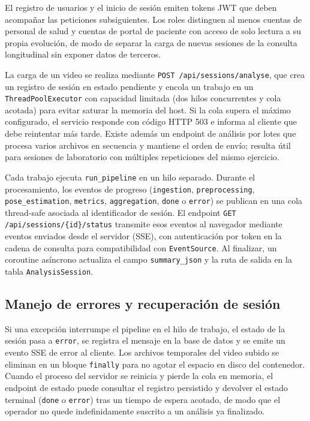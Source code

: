 El registro de usuarios y el inicio de sesión emiten tokens JWT que deben acompañar las peticiones subsiguientes. Los roles distinguen al menos cuentas de personal de salud y cuentas de portal de paciente con acceso de solo lectura a su propia evolución, de modo de separar la carga de nuevas sesiones de la consulta longitudinal sin exponer datos de terceros.

La carga de un video se realiza mediante \texttt{POST /api/sessions/analyse}, que crea un registro de sesión en estado pendiente y encola un trabajo en un \texttt{ThreadPoolExecutor} con capacidad limitada (dos hilos concurrentes y cola acotada) para evitar saturar la memoria del host. Si la cola supera el máximo configurado, el servicio responde con código HTTP 503 e informa al cliente que debe reintentar más tarde. Existe además un endpoint de análisis por lotes que procesa varios archivos en secuencia y mantiene el orden de envío; resulta útil para sesiones de laboratorio con múltiples repeticiones del mismo ejercicio.

\begin{sloppypar}
Cada trabajo ejecuta \texttt{run\_pipeline} en un hilo separado. Durante el procesamiento, los eventos de progreso (\texttt{ingestion}, \texttt{preprocessing}, \texttt{pose\_estimation}, \texttt{metrics}, \texttt{aggregation}, \texttt{done} o \texttt{error}) se publican en una cola thread-safe asociada al identificador de sesión. El endpoint \texttt{GET /api/sessions/\{id\}/status} transmite esos eventos al navegador mediante eventos enviados desde el servidor (SSE), con autenticación por token en la cadena de consulta para compatibilidad con \texttt{EventSource}. Al finalizar, un coroutine asíncrono actualiza el campo \texttt{summary\_json} y la ruta de salida en la tabla \texttt{AnalysisSession}.
\end{sloppypar}

\subsection{Manejo de errores y recuperación de sesión}

Si una excepción interrumpe el pipeline en el hilo de trabajo, el estado de la sesión pasa a \texttt{error}, se registra el mensaje en la base de datos y se emite un evento SSE de error al cliente. Los archivos temporales del video subido se eliminan en un bloque \texttt{finally} para no agotar el espacio en disco del contenedor. Cuando el proceso del servidor se reinicia y pierde la cola en memoria, el endpoint de estado puede consultar el registro persistido y devolver el estado terminal (\texttt{done} o \texttt{error}) tras un tiempo de espera acotado, de modo que el operador no quede indefinidamente suscrito a un análisis ya finalizado.

